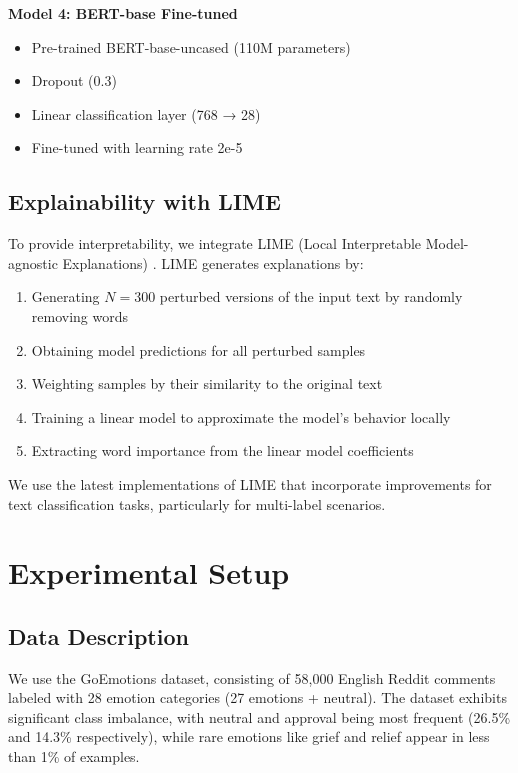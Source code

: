 \documentclass[12pt,a4paper]{article}
\begin{document}
\textbf{Model 4: BERT-base Fine-tuned}
\begin{itemize}
    \item Pre-trained BERT-base-uncased (110M parameters)
    \item Dropout (0.3)
    \item Linear classification layer (768 → 28)
    \item Fine-tuned with learning rate 2e-5
\end{itemize}

\subsection{Explainability with LIME}

To provide interpretability, we integrate LIME (Local Interpretable Model-agnostic Explanations) \cite{ribeiro2020lime}. LIME generates explanations by:

\begin{enumerate}
    \item Generating $N=300$ perturbed versions of the input text by randomly removing words
    \item Obtaining model predictions for all perturbed samples
    \item Weighting samples by their similarity to the original text
    \item Training a linear model to approximate the model's behavior locally
    \item Extracting word importance from the linear model coefficients
\end{enumerate}

We use the latest implementations of LIME that incorporate improvements for text classification tasks, particularly for multi-label scenarios.

\section{Experimental Setup}

\subsection{Data Description}

We use the GoEmotions dataset, consisting of 58,000 English Reddit comments labeled with 28 emotion categories (27 emotions + neutral). The dataset exhibits significant class imbalance, with neutral and approval being most frequent (26.5\% and 14.3\% respectively), while rare emotions like grief and relief appear in less than 1\% of examples.
\end{document}
